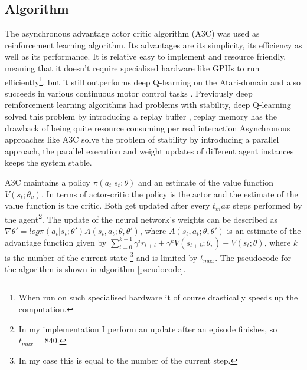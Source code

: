 \documentclass{article}
\begin{document}
\subsection{Algorithm}
\label{algorithm}
The asynchronous advantage actor critic algorithm (A3C) \cite{Mnih2016} was 
used as reinforcement learning algorithm. Its advantages are its simplicity, 
its efficiency as well as its performance. It is relative easy to implement and 
resource friendly, meaning that it doesn't require specialised hardware like 
GPUs to run efficiently\footnote{When run on such specialised hardware it of 
course drastically speeds up the computation.}, but it still outperforms deep 
Q-learning on the Atari-domain and also succeeds in various continuous motor 
control tasks \cite{Mnih2016}. Previously deep reinforcement learning algorithms
had problems with stability, deep Q-learning solved this problem by introducing 
a replay buffer \cite{Mnih2013}, replay memory has the drawback of being quite 
resource consuming per real interaction Asynchronous approaches like A3C solve 
the problem of stability by introducing a parallel approach, the parallel 
execution and weight updates of different agent instances keeps the system 
stable.

A3C maintains a policy $\pi(a_t|s_t;\theta)$ and an estimate of the 
value function $V(s_t;\theta_v)$. In terms of actor-critic the policy is the 
actor and the estimate of the value function is the critic. Both get updated 
after every $t_max$ steps performed by the agent\footnote{In my implementation 
I perform an update after an episode finishes, so $t_{max} = 840$.}. The update 
of the neural network's weights can be described as $\nabla \theta' = log 
\pi(a_t | s_t; \theta') A(s_t, a_t; \theta, \theta')$, where $A(s_t, a_t; 
\theta, \theta')$ is an estimate of the advantage function given by 
$\sum_{i=0}^{k-1} \gamma^i r_{t+i} + \gamma^k V(s_{t+k}; \theta_v) - V(s_t; 
\theta)$, where $k$ is the number of the current state \footnote{In my  case 
this is equal to the number of the current step.} and is limited by $t_{max}$. 
The pseudocode for the algorithm is shown in algorithm \ref{pseudocode}.
\end{document}
